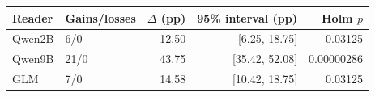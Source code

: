 \begin{tabular}{llrrr}
\toprule
Reader & Gains/losses & $\Delta$ (pp) & 95\% interval (pp) & Holm $p$ \\
\midrule
Qwen2B & 6/0 & 12.50 & [6.25, 18.75] & 0.03125 \\
Qwen9B & 21/0 & 43.75 & [35.42, 52.08] & 0.00000286 \\
GLM & 7/0 & 14.58 & [10.42, 18.75] & 0.03125 \\
\bottomrule
\end{tabular}
